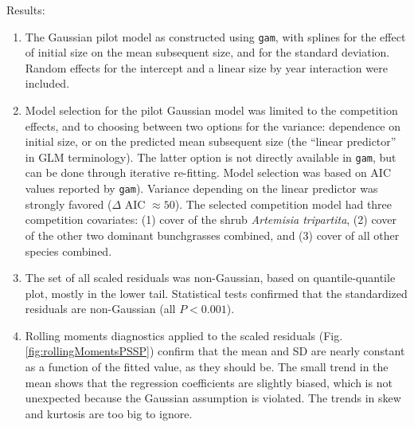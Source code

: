 \documentclass[11pt]{article}
\begin{document}
{Results: \begin{enumerate}

\item The Gaussian pilot model as constructed using \texttt{gam}, with splines for the effect of initial size on the
mean subsequent size, and for the standard deviation. Random effects for the intercept and a linear size by year interaction were
included. 

\item Model selection for the pilot Gaussian model was limited to the competition effects, and to choosing between
two options for the variance: dependence on initial size, or on the predicted mean subsequent size (the ``linear
predictor'' in GLM terminology). The latter option is not directly available in \texttt{gam}, but can be done 
through iterative re-fitting. Model selection was based on AIC values reported by \texttt{gam}). Variance depending on
the linear predictor was strongly favored ($\Delta$ AIC $\approx 50$). The selected competition model had  
three competition covariates: (1) cover of the shrub \emph{Artemisia tripartita}, (2) cover of the other two dominant 
bunchgrasses combined, and (3) cover of all other species combined. 

\item The set of all scaled residuals was non-Gaussian, based on quantile-quantile plot, mostly in the lower tail. Statistical tests
confirmed that the standardized residuals are non-Gaussian (all $P<0.001$). 

\item Rolling moments diagnostics applied to the scaled residuals (Fig. \ref{fig:rollingMomentsPSSP}) confirm that the mean 
and SD are nearly constant as a function of the fitted value, as they should be. The small trend in the mean shows that the 
regression coefficients are slightly biased, which is not unexpected because the Gaussian assumption is violated. 
The trends in skew and kurtosis are too big to ignore.  


\end{enumerate}}
\end{document}
